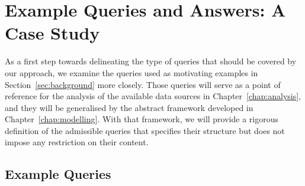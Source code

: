 \chapter{Example Queries and Answers: A Case Study}
\label{chap:prototype_queries}
\label{chap:example_queries}

As a first step towards delineating the type of queries that should be covered by our approach,
we examine the queries used as motivating examples in Section~\ref{sec:background} more closely.
Those queries will serve as a point of reference for the analysis of the available data sources
in Chapter~\ref{chap:analysis},
and they will be generalised by the abstract framework developed in Chapter~\ref{chap:modelling}.
With that framework, we will provide a rigorous definition of the admissible queries 
that specifies their structure but does not impose any restriction on their content.

\section{Example Queries}
\label{sec:prototype_queries}
\label{sec:example_queries}

